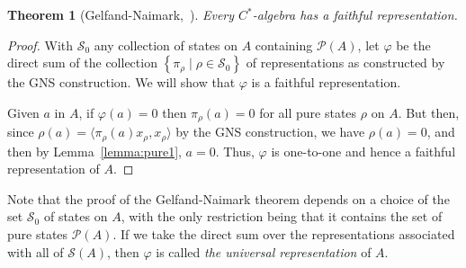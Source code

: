 \documentclass[11pt,a4paper]{report}
\theoremstyle{plain}
\newtheorem{thm}{Theorem}
\theoremstyle{definition}
\newcommand{\1}{\mathbbm{1}}
\renewcommand{\phi}{\varphi}
\renewcommand{\S}{\mathscr{S}}
\renewcommand{\P}[1]{\mathscr{P}(#1)}
\begin{document}
\begin{thm}[Gelfand-Naimark,~{\cite[4.5.6]{kadison83}}] \label{thm:gn}
	Every $C^\ast$-algebra has a faithful representation.
\end{thm}
\begin{proof}
	With $\S_0$ any collection of states on $A$ containing $\P{A}$, let $\phi$ be 
	the direct sum of the collection $\left\{\pi_\rho \mid \rho\in\S_0\right\}$ of 
	representations as constructed by the GNS construction. We will show that $\phi$ 
	is a faithful representation.

	
	Given $a$ in $A$, if $\phi(a)=0$ then $\pi_\rho(a)=0$ for all pure states $\rho$ 
	on $A$. But then, since $\rho(a)=\langle \pi_\rho (a) x_\rho, x_\rho \rangle$ by 
	the GNS construction, we have $\rho(a)=0$, and then by Lemma~\ref{lemma:pure1}, 
	$a=0$. Thus, $\phi$ is one-to-one and hence a faithful representation of $A$.

\end{proof}

Note that the proof of the Gelfand-Naimark theorem depends on a choice of the 
set $\S_0$ of states on $A$, with the only restriction being that it contains 
the set of pure states $\P A$. If we take the direct sum over the 
representations associated with all of $\S (A)$, then $\phi$ is called \emph{the 
universal representation} of $A$.
\end{document}
